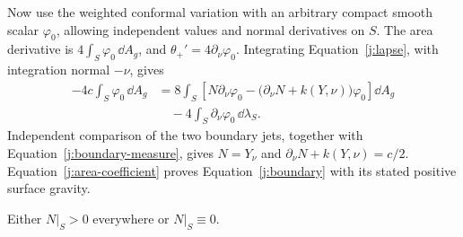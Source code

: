 Now use the weighted conformal variation with an arbitrary compact
smooth scalar \(\varphi_0\), allowing independent values and normal
derivatives on \(S\). The area derivative is
\(4\int_S\varphi_0\,\dd A_g\), and
\(\theta_+'=4\partial_\nu\varphi_0\).
Integrating Equation~\eqref{j:lapse}, with integration normal \(-\nu\),
gives
\begin{equation}
\label{j:boundary-conformal}
 \begin{split}
 -4c\int_S\varphi_0\,\dd A_g
 &=8\int_S\left[
       N\partial_\nu\varphi_0
       -\bigl(\partial_\nu N+k(Y,\nu)\bigr)\varphi_0
             \right]\dd A_g\\
 &\quad-4\int_S\partial_\nu\varphi_0\,\dd\lambda_S.
 \end{split}
\end{equation}
Independent comparison of the two boundary jets, together with
Equation~\eqref{j:boundary-measure}, gives
\(N=Y_\nu\) and
\(\partial_\nu N+k(Y,\nu)=c/2\).
Equation~\eqref{j:area-coefficient} proves
Equation~\eqref{j:boundary} with its stated positive surface gravity.

\begin{lemma}
\label{j:dichotomy}
Either \(N|_S>0\) everywhere or \(N|_S\equiv0\).
\end{lemma}

